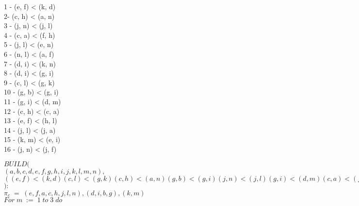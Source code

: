 \documentclass[paper=a4, fontsize=11pt]{scrartcl}
\newcommand\tab[1][1cm]{\hspace*{#1}}
\numberwithin{equation}{section}		%
\numberwithin{figure}{section}			%
\numberwithin{table}{section}				%
\begin{document}
\begin{center}
1 - (e, f) < (k, d)\\
2- (c, h) < (a, n)\\
3 - (j, n) < (j, l)\\
4 - (c, a) < (f, h)\\
5 - (j, l) < (e, n)\\
6 - (n, l) < (a, f)\\
7 - (d, i) < (k, n)\\
8 - (d, i) < (g, i)\\
9 - (c, l) < (g, k)\\
10 - (g, b) < (g, i)\\
11 - (g, i) < (d, m)\\
12 - (c, h) < (c, a)\\
13 - (e, f) < (h, l)\\
14 -  (j, l) < (j, a)\\
15 - (k, m) < (e, i)\\
16 -  (j, n) < (j, f)\\
\end{center}
\fi

\noindent
$BUILD($\\
\tab$(a,b,c,d,e,f,g,h,i,j,k,l,m,n),$\\
\tab$((e, f) < (k, d) (c, l) < (g, k) (c, h) < (a, n) (g, b) < (g, i) (j, n) < (j, l) (g, i) < (d, m) (c, a) < (f, h) (c, h) < (c, a) (j, l) < (e, n) (e, f) < (h, l) (n, l) < (a, f) (j, l) < (j, a) (d, i) < (k, n) (k, m) < (e, i) (d, i) < (g, i) (j, n) < (j, f))$\\
$):$\\


\noindent
\tab$\pi_c\;=\;(e,f,a,c,h,j,l,n),(d,i,b,g),(k,m)$\\


\noindent
\tab$For\;m\;:=\;1\;to\;3\;do$\\
\end{document}

